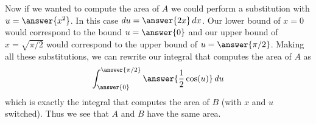 \documentclass{ximera}
\begin{document}
\begin{exercise}
Now if we wanted to compute the area of $A$ we could perform a substitution with $u=\answer{x^2}$. In this case $\d{u}=\answer{2x}\d{x}$.  Our lower bound of $x=0$ would correspond to the bound $u=\answer{0}$ and our upper bound of $x=\sqrt{\pi/2}$ would correspond to the upper bound of $u=\answer{\pi/2}$. Making all these substitutions, we can rewrite our integral that computes the area of $A$ as
\[
\int_{\answer{0}}^{\answer{\pi/2}} \answer{\frac{1}{2}\cos(u)}\d{u}
\]
which is exactly the integral that computes the area of $B$ (with $x$ and $u$ switched).  Thus we see that $A$ and $B$ have the same area.

\end{exercise}
\end{document}
